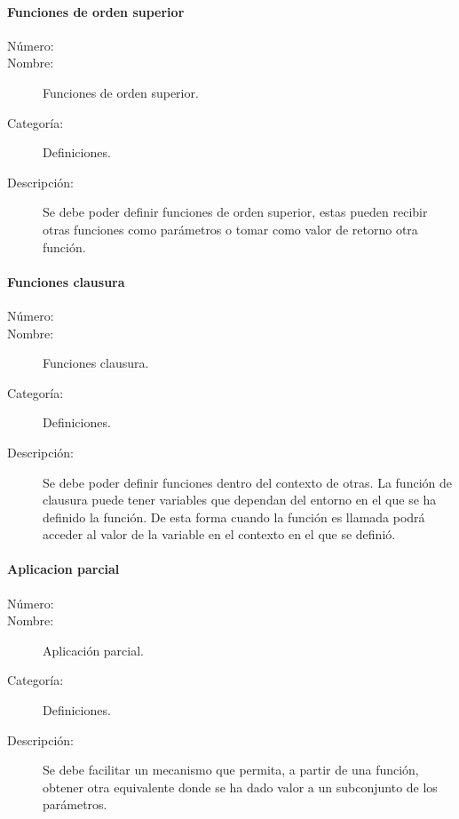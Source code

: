\paragraph{Funciones de orden superior}
\begin{framed}
	\begin{description}
		\item [Número:] \cn
		\item [Nombre:]  Funciones de orden superior.
		\item [Categoría:] Definiciones.
		\item [Descripción:] Se debe poder definir funciones de orden superior, estas pueden recibir otras funciones como parámetros o tomar como valor de 
      retorno otra función.  
	\end{description}
\end{framed}

\paragraph{Funciones clausura}
\begin{framed}
	\begin{description}
		\item [Número:] \cn
		\item [Nombre:]  Funciones clausura.
		\item [Categoría:] Definiciones.
		\item [Descripción:] Se debe poder definir funciones dentro del contexto de otras. La función de clausura puede tener variables que dependan 
      del entorno en el que se ha definido la función. De esta forma cuando la función es llamada podrá acceder al valor de la variable en el contexto
      en el que se definió.
	\end{description}
\end{framed}

\paragraph{Aplicacion parcial}
\begin{framed}
	\begin{description}
		\item [Número:] \cn
		\item [Nombre:] Aplicación parcial.
		\item [Categoría:] Definiciones.
		\item [Descripción:] Se debe facilitar un mecanismo que permita, a partir de una función, obtener otra
      equivalente donde se ha dado valor a un subconjunto de los parámetros.
    \end{description}
\end{framed}


